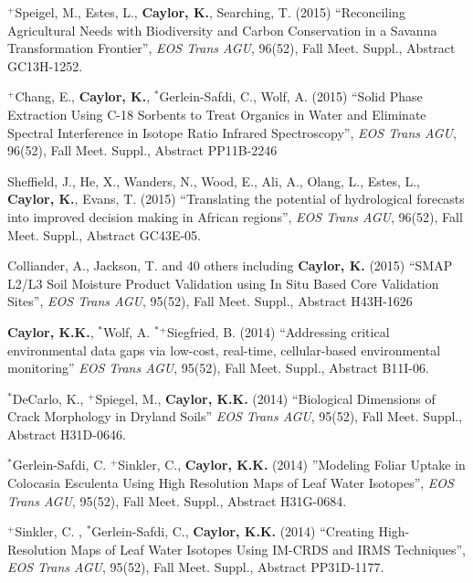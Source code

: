 \documentclass[10pt]{report}
\begin{document}
\begin{etaremune}
\item $^{+}$Speigel, M., Estes, L., \textbf{Caylor, K.}, Searching, T. (2015) ``Reconciling Agricultural Needs with Biodiversity and Carbon Conservation in a Savanna Transformation Frontier'', \emph{EOS Trans AGU}, 96(52), Fall Meet. Suppl., Abstract GC13H-1252.

\item $^{+}$Chang, E., \textbf{Caylor, K.}, $^{*}$Gerlein-Safdi, C., Wolf, A. (2015) ``Solid Phase Extraction Using C-18 Sorbents to Treat Organics in Water and Eliminate Spectral Interference in Isotope Ratio Infrared Spectroscopy'', \emph{EOS Trans AGU}, 96(52), Fall Meet. Suppl., Abstract PP11B-2246

\item Sheffield, J., He, X., Wanders, N., Wood, E., Ali, A., Olang, L., Estes, L., \textbf{Caylor, K.}, Evans, T. (2015) ``Translating the potential of hydrological forecasts into improved decision making in African regions'', \emph{EOS Trans AGU}, 96(52), Fall Meet. Suppl., Abstract GC43E-05.

\item Colliander, A., Jackson, T. and 40 others including \textbf{Caylor, K.} (2015) ``SMAP L2/L3 Soil Moisture Product Validation using In Situ Based Core Validation Sites'', \emph{EOS Trans AGU}, 95(52), Fall Meet. Suppl., Abstract H43H-1626

\item  \textbf{Caylor, K.K.}, $^{*}$Wolf, A.  $^{*}$$^{+}$Siegfried, B. (2014)  ``Addressing critical environmental data gaps via low-cost, real-time, cellular-based environmental monitoring'' \emph{EOS Trans AGU}, 95(52), Fall Meet. Suppl., Abstract B11I-06.

\item $^{*}$DeCarlo, K., $^{+}$Spiegel, M.,  \textbf{Caylor, K.K.} (2014) ``Biological Dimensions of Crack Morphology in Dryland Soils''  \emph{EOS Trans AGU}, 95(52), Fall Meet. Suppl., Abstract H31D-0646.

\item $^{*}$Gerlein-Safdi, C. $^{+}$Sinkler, C., \textbf{Caylor, K.K.} (2014) ''Modeling Foliar Uptake in Colocasia Esculenta Using High Resolution Maps of Leaf Water Isotopes'', \emph{EOS Trans AGU}, 95(52), Fall Meet. Suppl., Abstract H31G-0684.

\item $^{+}$Sinkler, C. , $^{*}$Gerlein-Safdi, C.,  \textbf{Caylor, K.K.} (2014) ``Creating High-Resolution Maps of Leaf Water Isotopes Using IM-CRDS and IRMS Techniques'',  \emph{EOS Trans AGU}, 95(52), Fall Meet. Suppl., Abstract PP31D-1177.


\end{etaremune}
\end{document}
